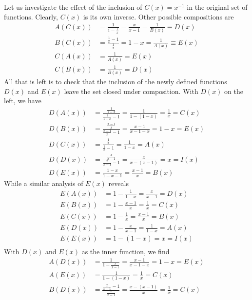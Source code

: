\documentclass[../group-theory-in-a-nutshell-for-physicists.tex]{subfiles}
\begin{document}
\begin{questions}
\begin{solution}
	Let us investigate the effect of the inclusion of $C(x)=x^{-1}$ in the original set of functions. Clearly, $C(x)$ is its own inverse. Other possible compositions are
	\begin{align*}
		A(C(x)) &= \frac{1}{1 - \frac{1}{x}} = \frac{x}{x - 1} = \frac{1}{B(x)} \equiv D(x) \\
		B(C(x)) &= \frac{\frac{1}{x} - 1}{\frac{1}{x}} = 1 - x = \frac{1}{A(x)} \equiv E(x) \\
		C(A(x)) &= \frac{1}{A(x)} = E(x) \\
		C(B(x)) &= \frac{1}{B(x)} = D(x)
	\end{align*}
	All that is left is to check that the inclusion of the newly defined functions $D(x)$ and $E(x)$ leave the set closed under composition. With $D(x)$ on the left, we have
	\begin{align*}
		D(A(x)) &= \frac{\frac{1}{1 - x}}{\frac{1}{1 - x} - 1} = \frac{1}{1 - (1 - x)} = \frac{1}{x} = C(x) \\
		D(B(x)) &= \frac{\frac{x - 1}{x}}{\frac{x - 1}{x} - 1} = \frac{x - 1}{x - 1 - x} = 1 - x = E(x) \\
		D(C(x)) &= \frac{\frac{1}{x}}{\frac{1}{x} - 1} = \frac{1}{1 - x} = A(x) \\
		D(D(x)) &= \frac{\frac{x}{x - 1}}{\frac{x}{x - 1} - 1} = \frac{x}{x - (x - 1)} = x = I(x) \\
		D(E(x)) &= \frac{1 - x}{1 - x - 1} = \frac{x - 1}{x} = B(x) 
	\end{align*}
	While a similar analysis of $E(x)$ reveals
	\begin{align*}
		E(A(x)) &= 1 - \frac{1}{1 - x} = \frac{x}{x - 1} = D(x) \\
		E(B(x)) &= 1 - \frac{x - 1}{x} = \frac{1}{x} = C(x) \\
		E(C(x)) &= 1 - \frac{1}{x} = \frac{x - 1}{x} = B(x) \\
		E(D(x)) &= 1 - \frac{x}{x - 1} = \frac{1}{1 - x} = A(x)\\
		E(E(x)) &= 1 - (1 - x) = x = I(x) \\
	\end{align*}
	With $D(x)$ and $E(x)$ as the inner function, we find
	\begin{align*}
		A(D(x)) &= \frac{1}{1 - \frac{x}{x - 1}} = \frac{x - 1}{x - 1 - x} = 1 - x = E(x) \\
		A(E(x)) &= \frac{1}{1 - (1 - x)} = \frac{1}{x} = C(x) \\
		B(D(x)) &= \frac{\frac{x}{x - 1} - 1}{\frac{x}{x - 1}} = \frac{x - (x - 1)}{x} = \frac{1}{x} = C(x) \\

\end{align*}
\end{solution}
\end{questions}
\end{document}
